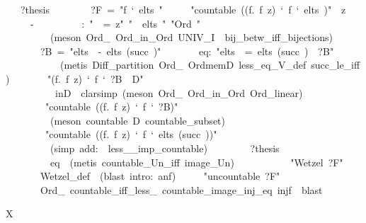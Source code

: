 \documentclass[runningheads]{llncs}
\begin{document}
\begin{isabelle}
\ \ \ ?thesis\isanewline
\ \ \isanewline
\ \ \ \ \ ?F\ =\ "f\ `\ elts\ "\isanewline
\ \ \ \ \ "countable\ ((\isasymlambda f.\ f\ z)\ `\ f\ `\ elts\ )"\ \ z\isanewline
\ \ \ \ \ -\isanewline
\ \ \ \ \ \ \ \isasymalpha \ \ \isasymalpha :\ "\isasymzeta \ \isasymalpha \ =\ z"\ "\isasymalpha \ \isasymin \ elts\ "\ "Ord\ \isasymalpha "\isanewline
\ \ \ \ \ \ \ \ \ (meson\ Ord\_\ Ord\_in\_Ord\ UNIV\_I\ \isasymzeta \ bij\_betw\_iff\_bijections)\isanewline
\ \ \ \ \ \ \ ?B\ =\ "elts\ \ -\ elts\ (succ\ \isasymalpha )"\isanewline
\ \ \ \ \ \ \ eq:\ "elts\ \ =\ elts\ (succ\ \isasymalpha )\ \isasymunion \ ?B"\isanewline
\ \ \ \ \ \ \ \ \ \isasymalpha \ \ (metis\ Diff\_partition\ Ord\_\ OrdmemD\ less\_eq\_V\_def\ succ\_le\_iff)\isanewline
\ \ \ \ \ \ \ "(\isasymlambda f.\ f\ z)\ `\ f\ `\ ?B\ \isasymsubseteq \ D"\isanewline
\ \ \ \ \ \ \ \ \ \isasymalpha \ inD\ \ clarsimp\ (meson\ Ord\_\ Ord\_in\_Ord\ Ord\_linear)\isanewline
\ \ \ \ \ \ \ \ "countable\ ((\isasymlambda f.\ f\ z)\ `\ f\ `\ ?B)"\isanewline
\ \ \ \ \ \ \ \ \ (meson\ \isacartoucheopen countable\ D\isacartoucheclose \ countable\_subset)\isanewline
\ \ \ \ \ \ \ \ "countable\ ((\isasymlambda f.\ f\ z)\ `\ f\ `\ elts\ (succ\ \isasymalpha ))"\isanewline
\ \ \ \ \ \ \ \ \ (simp\ add:\ \isasymalpha \ less\_\_imp\_countable)\isanewline
\ \ \ \ \ \ \ \ ?thesis\isanewline
\ \ \ \ \ \ \ \ \ eq\ \ (metis\ countable\_Un\_iff\ image\_Un)\isanewline
\ \ \ \ \isanewline
\ \ \ \ \ \ "Wetzel\ ?F"\isanewline
\ \ \ \ \ \ \ Wetzel\_def\ \ (blast\ intro:\ anf)\isanewline
\ \ \ \ \ "uncountable\ ?F"\isanewline
\ \ \ \ \ \ \ Ord\_\ countable\_iff\_less\_\ countable\_image\_inj\_eq\ injf\ \ blast\isanewline
\ \ \isanewline
{}
\end{isabelle}

\begin{isabelle}
X
\end{isabelle}
\end{document}
